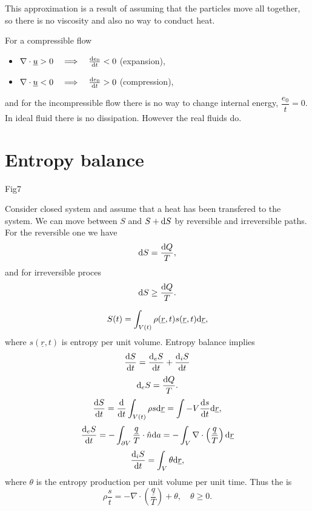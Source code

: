 \documentclass[11pt,oneside]{book}
\renewcommand{\vec}[1]{\underline{#1}}
\theoremstyle{definition} %
\theoremstyle{plain} %
\theoremstyle{remark} %
\theoremstyle{underline}
\begin{document}
  This approximation is a result of assuming that the particles move all together, so there is no viscosity and also no way to conduct heat.
  
  For a compressible flow
  \begin{itemize}
    \item $\nabla \cdot \vec u > 0 \qLRa \dfrac{e_0}{t} < 0 $ (expansion),
    \item $\nabla \cdot \vec u < 0 \qLRa \dfrac{e_0}{t} > 0 $ (compression),
  \end{itemize}
  and for the incompressible flow there is no way to change internal energy, $\dfrac{e_0}{t} = 0$.
  In ideal fluid there is no dissipation.
  However the real fluids do.

  \section{Entropy balance} 
  
  \todo Fig7

  Consider closed system and assume that a heat has been transfered to the system.
  We can move between $S$ and $S + \mathrm{d} S$ by reversible and irreversible paths.
  For the reversible one we have 
  \begin{displaymath}
    \mathrm{d} S  = \frac{\mathrm{d} Q}{T},
  \end{displaymath}
  and for irreversible proces
  \begin{displaymath}
    \mathrm{d} S \geq \frac{\mathrm{d} Q}{T}.
  \end{displaymath}
  
  \begin{displaymath}
    S(t) = \int_{V(t)} \rho( \vec r , t) s( \vec r, t) \d \vec r,
  \end{displaymath}
  where $s(\vec r, t)$ is entropy per unit volume.
  Entropy balance implies
  \begin{displaymath}
    \frac{\mathrm{d} S}{\mathrm{d} t} = \frac{\mathrm{d}_e S}{\mathrm{d} t} + \frac{\mathrm{d}_i S}{\mathrm{d} t} 
  \end{displaymath}
  \begin{displaymath}
    \mathrm{d}_e S = \frac{\mathrm{d} Q}{T}.
  \end{displaymath}
  \begin{displaymath}
    \dfrac{S}{t} = \dfrac{}{t} \int_{V(t)} \rho s \d \vec r = \int-V \dfrac{s}{t} \d \vec r,
  \end{displaymath}
  \begin{displaymath}
    \dfrac{_e S}{t} = - \int_{\partial V} \frac{ \vec q}{T} \cdot \hat n \d a 
    = - \int_V \nabla \cdot \left( \frac{\vec q}{T} \right) \d \vec r
  \end{displaymath}
  \begin{displaymath}
    \dfrac{_i S}{t} = \int_V \theta \d \vec r,
  \end{displaymath}
  where $\theta$ is the entropy production per unit volume per unit time.
  Thus the  is
  \begin{displaymath}
    \rho \dfrac{s}{t} = - \nabla \cdot \left( \frac{\vec q }{T}  \right) + \theta, \quad \theta \geq 0.
  \end{displaymath}
\end{document}
